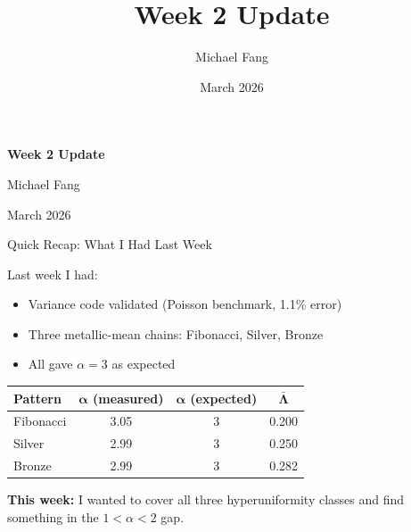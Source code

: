 \documentclass[aspectratio=169, 11pt]{beamer}
\title{Week 2 Update}
\author{Michael Fang}
\date{March 2026}
\begin{document}
\begin{frame}
\centering
\vspace{2em}
{\Large\textbf{Week 2 Update}}

\vspace{1em}
Michael Fang

\vspace{0.5em}
March 2026
\end{frame}

\begin{frame}{Quick Recap: What I Had Last Week}

Last week I had:
\begin{itemize}
    \item Variance code validated (Poisson benchmark, 1.1\% error)
    \item Three metallic-mean chains: Fibonacci, Silver, Bronze
    \item All gave $\alpha = 3$ as expected
\end{itemize}

\vspace{0.5em}
\begin{table}
\centering
\begin{tabular}{lccc}
\toprule
\textbf{Pattern} & $\boldsymbol{\alpha}$ (measured) & $\boldsymbol{\alpha}$ (expected) & $\boldsymbol{\bar{\Lambda}}$ \\
\midrule
Fibonacci & 3.05 & 3 & 0.200 \\
Silver & 2.99 & 3 & 0.250 \\
Bronze & 2.99 & 3 & 0.282 \\
\bottomrule
\end{tabular}
\end{table}

\vspace{0.5em}
\textbf{This week:} I wanted to cover all three hyperuniformity classes and find something in the $1 < \alpha < 2$ gap.
\end{frame}
\end{document}
